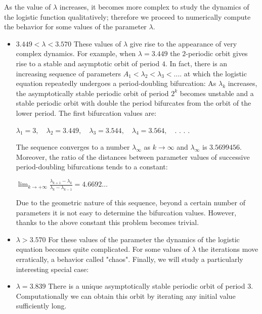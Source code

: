 \documentclass[12pt,a4paper]{report}
\theoremstyle{definition}
\begin{document}
\begin{itemize}
\end{itemize}

As the value of $\lambda$ increases, it becomes more complex to study the dynamics of the logistic function qualitatively; therefore we proceed to numerically compute the behavior for some values of the parameter $\lambda$.

\begin{itemize}

\item $3.449 < \lambda < 3.570$ These values of $\lambda$ give rise to the appearance of very complex dynamics. For example, when $\lambda = 3.449$ the $2$-periodic orbit gives rise to a stable and asymptotic orbit of period $4$. In fact, there is an increasing sequence of parameters $A_1 < \lambda_2 < \lambda_3 < ....$ at which the logistic equation repeatedly undergoes a period-doubling bifurcation: As $\lambda_k$ increases, the asymptotically stable periodic orbit of period $2^k$ becomes unstable and a stable periodic orbit with double the period bifurcates from the orbit of the lower period. The first bifurcation values are:

$
\lambda_1 = 3, \quad \lambda_2 = 3.449, \quad \lambda_3 = 3.544, \quad \lambda_4 = 3.564, \quad \text{.\ .\ .\ .}
$

The sequence converges to a number $\lambda_\infty$ as $k \to \infty$ and $\lambda_\infty$ is $3.5699456$. Moreover, the ratio of the distances between parameter values of successive period-doubling bifurcations tends to a constant:

$
\lim_{k \to +\infty} \frac{\lambda_{k+1} - \lambda_k}{\lambda_k - \lambda_{k-1}} = 4.6692 \ldots
$

Due to the geometric nature of this sequence, beyond a certain number of parameters it is not easy to determine the bifurcation values. However, thanks to the above constant this problem becomes trivial.

\item $\lambda > 3.570$ For these values of the parameter the dynamics of the logistic equation becomes quite complicated. For some values of $\lambda$ the iterations move erratically, a behavior called "chaos". Finally, we will study a particularly interesting special case:

\item $\lambda = 3.839$ There is a unique asymptotically stable periodic orbit of period $3$. Computationally we can obtain this orbit by iterating any initial value sufficiently long.


\end{itemize}
\end{document}
